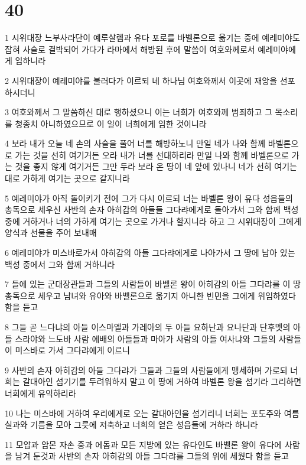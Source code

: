 \chapter{40}

\par 1 시위대장 느부사라단이 예루살렘과 유다 포로를 바벨론으로 옮기는 중에 예레미야도 잡혀 사슬로 결박되어 가다가 라마에서 해방된 후에 말씀이 여호와께로서 예레미야에게 임하니라
\par 2 시위대장이 예레미야를 불러다가 이르되 네 하나님 여호와께서 이곳에 재앙을 선포하시더니
\par 3 여호와께서 그 말씀하신 대로 행하셨으니 이는 너희가 여호와께 범죄하고 그 목소리를 청종치 아니하였으므로 이 일이 너희에게 임한 것이니라
\par 4 보라 내가 오늘 네 손의 사슬을 풀어 너를 해방하노니 만일 네가 나와 함께 바벨론으로 가는 것을 선히 여기거든 오라 내가 너를 선대하리라 만일 나와 함께 바벨론으로 가는 것을 좋지 않게 여기거든 그만 두라 보라 온 땅이 네 앞에 있나니 네가 선히 여기는대로 가하게 여기는 곳으로 갈지니라
\par 5 예레미야가 아직 돌이키기 전에 그가 다시 이르되 너는 바벨론 왕이 유다 성읍들의 총독으로 세우신 사반의 손자 아히감의 아들들 그다랴에게로 돌아가서 그와 함께 백성 중에 거하거나 너의 가하게 여기는 곳으로 가거나 할지니라 하고 그 시위대장이 그에게 양식과 선물을 주어 보내매
\par 6 예레미야가 미스바로가서 아히감의 아들 그다랴에게로 나아가서 그 땅에 남아 있는 백성 중에서 그와 함께 거하니라
\par 7 들에 있는 군대장관들과 그들의 사람들이 바벨론 왕이 아히감의 아들 그다랴를 이 땅 총독으로 세우고 남녀와 유아와 바벨론으로 옮기지 아니한 빈민을 그에게 위임하였다 함을 듣고
\par 8 그들 곧 느다냐의 아들 이스마엘과 가레아의 두 아들 요하난과 요나단과 단후멧의 아들 스라야와 느도바 사람 에배의 아들들과 마아가 사람의 아들 여사냐와 그들의 사람들이 미스바로 가서 그다랴에게 이르니
\par 9 사반의 손자 아히감의 아들 그다랴가 그들과 그들의 사람들에게 맹세하며 가로되 너희는 갈대아인 섬기기를 두려워하지 말고 이 땅에 거하여 바벨론 왕을 섬기라 그리하면 너희에게 유익하리라
\par 10 나는 미스바에 거하여 우리에게로 오는 갈대아인을 섬기리니 너희는 포도주와 여름 실과와 기름을 모아 그릇에 저축하고 너희의 얻은 성읍들에 거하라 하니라
\par 11 모압과 암몬 자손 중과 에돔과 모든 지방에 있는 유다인도 바벨론 왕이 유다에 사람을 남겨 둔것과 사반의 손자 아히감의 아들 그다랴를 그들의 위에 세웠다 함을 듣고
